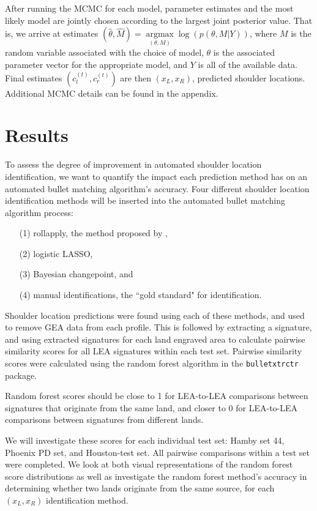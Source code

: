 \documentclass[12pt]{article}
\begin{document}
After running the MCMC for each model, parameter estimates and the most
likely model are jointly chosen according to the largest joint posterior
value. That is, we arrive at estimates
\((\hat{\theta}, \hat{M}) = \underset{(\theta, M)}{\operatorname{argmax}}{\log(p(\theta, M | Y))}\),
where \(M\) is the random variable associated with the choice of model,
\(\theta\) is the associated parameter vector for the appropriate model,
and \(Y\) is all of the available data. Final estimates
\((c_l^{(t)}, c_r^{(t)})\) are then \((x_L, x_R)\), predicted shoulder
locations. Additional MCMC details can be found in the appendix.

\section{Results}

To assess the degree of improvement in automated shoulder location
identification, we want to quantify the impact each prediction method
has on an automated bullet matching algorithm's accuracy. Four different
shoulder location identification methods will be inserted into the
automated bullet matching algorithm process:

\begin{itemize}
\item[(1)] rollapply, the method proposed by \cite{Hare1}, 
\item[(2)] logistic LASSO,
\item[(3)] Bayesian changepoint, and
\item[(4)] manual identifications, the ``gold standard" for identification.  
\end{itemize}

Shoulder location predictions were found using each of these methods,
and used to remove GEA data from each profile. This is followed by
extracting a signature, and using extracted signatures for each land
engraved area to calculate pairwise similarity scores for all LEA
signatures within each test set. Pairwise similarity scores were
calculated using the random forest algorithm in the
\texttt{bulletxtrctr} package.

Random forest scores should be close to 1 for LEA-to-LEA comparisons
between signatures that originate from the same land, and closer to 0
for LEA-to-LEA comparisons between signatures from different lands.

We will investigate these scores for each individual test set: Hamby set
44, Phoenix PD set, and Houston-test set. All pairwise comparisons
within a test set were completed. We look at both visual representations
of the random forest score distributions as well as investigate the
random forest method's accuracy in determining whether two lands
originate from the same source, for each \((x_L, x_R)\) identification
method.
\end{document}
